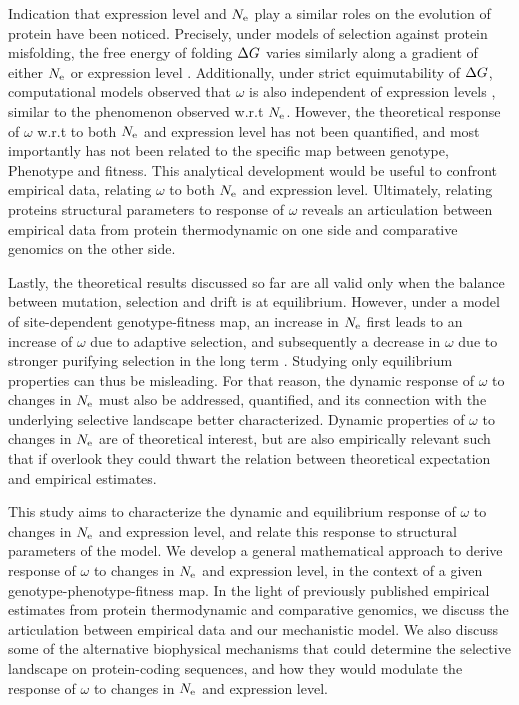 Indication that expression level and $N_{\mathrm{e}}$ play a similar roles on the evolution of protein have been noticed.
Precisely, under models of selection against protein misfolding, the free energy of folding $\Delta G$ varies similarly along a gradient of either $N_{\mathrm{e}}$ or expression level \citep{Serohijos2013}.
Additionally, under strict equimutability of $\Delta G$, computational models observed that $\omega$ is also independent of expression levels \citep{Serohijos2012}, similar to the phenomenon observed w.r.t $N_{\mathrm{e}}$.
However, the theoretical response of $\omega$ w.r.t to both $N_{\mathrm{e}}$ and expression level has not been quantified, and most importantly has not been related to the specific map between genotype, \gls{Phenotype} and fitness.
This analytical development would be useful to confront empirical data, relating $\omega$ to both $N_{\mathrm{e}}$ and expression level.
Ultimately, relating proteins structural parameters to response of $\omega$ reveals an articulation between empirical data from protein thermodynamic on one side and comparative genomics on the other side. 

Lastly, the theoretical results discussed so far are all valid only when the balance between mutation, selection and drift is at equilibrium.
However, under a model of site-dependent genotype-fitness map, an increase in $N_{\mathrm{e}}$ first leads to an increase of $\omega$ due to adaptive selection, and subsequently a decrease in $\omega$ due to stronger purifying selection in the long term \citep{Jones2016}.
Studying only equilibrium properties can thus be misleading.
For that reason, the dynamic response of $\omega$ to changes in $N_{\mathrm{e}}$ must also be addressed, quantified, and its connection with the underlying selective landscape better characterized.
Dynamic properties of $\omega$ to changes in $N_{\mathrm{e}}$ are of theoretical interest, but are also empirically relevant such that if overlook they could thwart the relation between theoretical expectation and empirical estimates.

This study aims to characterize the dynamic and equilibrium response of $\omega$ to changes in $N_{\mathrm{e}}$ and expression level, and relate this response to structural parameters of the model.
We develop a general mathematical approach to derive response of $\omega$ to changes in $N_{\mathrm{e}}$ and expression level, in the context of a given genotype-phenotype-fitness map.
In the light of previously published empirical estimates from protein thermodynamic and comparative genomics, we discuss the articulation between empirical data and our mechanistic model.
We also discuss some of the alternative biophysical mechanisms that could determine the selective landscape on protein-coding sequences, and how they would modulate the response of $\omega$ to changes in $N_{\mathrm{e}}$ and expression level.

